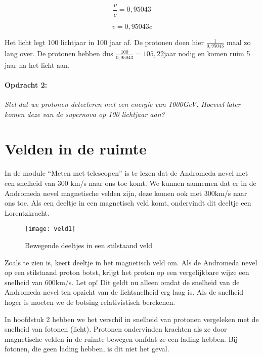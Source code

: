\begin{equation}
\frac{v}{c}=0,95043
\end{equation}


\begin{equation}
v=0,95043c
\end{equation}


Het licht legt 100 lichtjaar in 100 jaar af. De protonen doen hier
$\frac{1}{0,95043}$ maal zo lang over. De protonen hebben dus $\frac{100}{0,95043}=105,22$jaar
nodig en komen ruim 5 jaar na het licht aan.


\paragraph*{Opdracht 2:}

\emph{Stel dat we protonen detecteren met een energie van 1000GeV.
Hoeveel later komen deze van de supernova op 100 lichtjaar aan?}


\section{Velden in de ruimte}

In de module ``Meten met telescopen'' is te lezen dat de Andromeda
nevel met een snelheid van 300 km/s naar ons toe komt. We kunnen aannemen
dat er in de Andromeda nevel magnetische velden zijn, deze komen ook
met 300km/s naar ons toe. Als een deeltje in een magnetisch veld komt,
ondervindt dit deeltje een Lorentzkracht.

\begin{figure}
\noindent \begin{centering}
\texttt{[image: veld1]}
\par\end{centering}

\caption{Bewegende deeltjes in een stilstaand veld}
\end{figure}


Zoals te zien is, keert deeltje in het magnetisch veld om. Als de
Andromeda nevel op een stilstaand proton botst, krijgt het proton
op een vergelijkbare wijze een snelheid van 600km/s. Let op! Dit geldt
nu alleen omdat de snelheid van de Andromeda nevel ten opzicht van
de lichtsnelheid erg laag is. Als de snelheid hoger is moeten we de
botsing relativistisch berekenen. 

In hoofdstuk 2 hebben we het verschil in snelheid van protonen vergeleken
met de snelheid van fotonen (licht). Protonen ondervinden krachten
als ze door magnetische velden in de ruimte bewegen omfdat ze een
lading hebben. Bij fotonen, die geen lading hebben, is dit niet het
geval.


